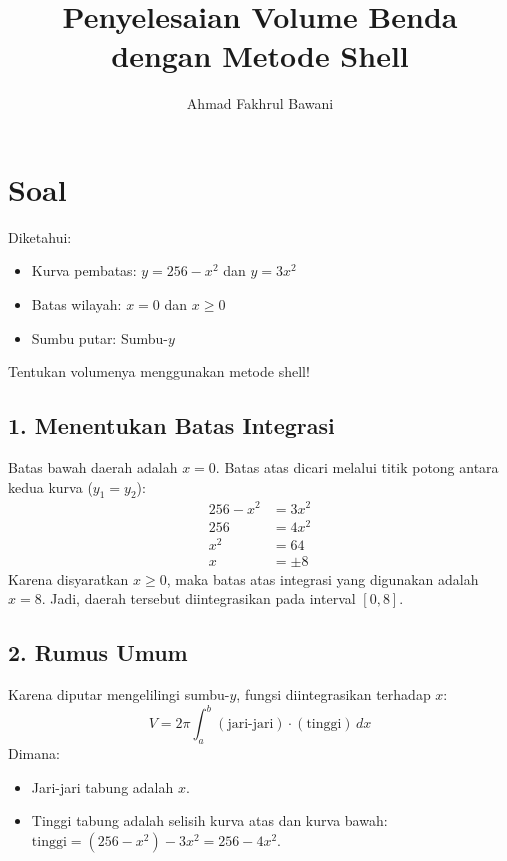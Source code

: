 \documentclass[12pt,a4paper]{article}
\title{Penyelesaian Volume Benda dengan Metode Shell}
\author{Ahmad Fakhrul Bawani}
\date{}
\begin{document}
\maketitle

\section*{Soal}

Diketahui:
\begin{itemize}
  \item Kurva pembatas: $y = 256 - x^2$ dan $y = 3x^2$
  \item Batas wilayah: $x = 0$ dan $x \ge 0$
  \item Sumbu putar: Sumbu-$y$
\end{itemize}
Tentukan volumenya menggunakan metode shell!

\subsection*{1. Menentukan Batas Integrasi}
Batas bawah daerah adalah $x = 0$. Batas atas dicari melalui titik potong antara kedua kurva ($y_1 = y_2$):
\begin{align*}
  256 - x^2 &= 3x^2 \\
  256 &= 4x^2 \\
  x^2 &= 64 \\
  x &= \pm 8
\end{align*}
Karena disyaratkan $x \ge 0$, maka batas atas integrasi yang digunakan adalah $x = 8$. Jadi, daerah tersebut diintegrasikan pada interval $[0, 8]$.

\subsection*{2. Rumus Umum}
Karena diputar mengelilingi sumbu-$y$, fungsi diintegrasikan terhadap $x$:
\begin{equation*}
  V = 2\pi \int_{a}^{b} (\text{jari-jari}) \cdot (\text{tinggi}) \, dx
\end{equation*}
Dimana:
\begin{itemize}
  \item Jari-jari tabung adalah $x$.
  \item Tinggi tabung adalah selisih kurva atas dan kurva bawah: \\
        $\text{tinggi} = (256 - x^2) - 3x^2 = 256 - 4x^2$.
\end{itemize}
\end{document}
